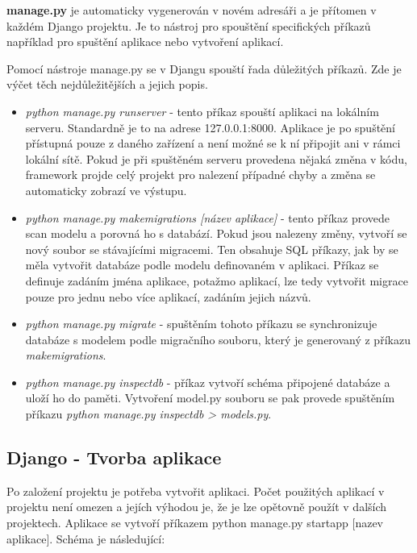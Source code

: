 \textbf{manage.py} je automaticky vygenerován v novém adresáři a je přítomen v každém Django projektu. Je to nástroj pro spouštění specifických příkazů například pro spuštění aplikace nebo vytvoření aplikací.

\newpage

Pomocí nástroje manage.py se v Djangu spouští řada důležitých příkazů. Zde je výčet těch nejdůležitějších a jejich popis.

\begin{itemize}
	\item \textit{python manage.py runserver} - tento příkaz spouští aplikaci na lokálním serveru. Standardně je to na adrese 127.0.0.1:8000. Aplikace je po spuštění přístupná pouze z daného zařízení a není možné se k ní připojit ani v rámci lokální sítě. Pokud je při spuštěném serveru provedena nějaká změna v kódu, framework projde celý projekt pro nalezení případné chyby a změna se automaticky zobrazí ve výstupu.
	
	\item \textit{python manage.py makemigrations [název aplikace]} - tento příkaz provede scan modelu a porovná ho s databází. Pokud jsou nalezeny změny, vytvoří se nový soubor se stávajícími migracemi. Ten obsahuje SQL příkazy, jak by se měla vytvořit databáze podle modelu definovaném v aplikaci. Příkaz se definuje zadáním jména aplikace, potažmo aplikací, lze tedy vytvořit migrace pouze pro jednu nebo více aplikací, zadáním jejich názvů.

	\item \textit{python manage.py migrate} - spuštěním tohoto příkazu se synchronizuje databáze s modelem podle migračního souboru, který je generovaný z příkazu \newline \textit{makemigrations}. 
	
	\item \textit{python manage.py inspectdb} - příkaz vytvoří schéma připojené databáze a uloží ho do paměti. Vytvoření model.py souboru se pak provede spuštěním příkazu
\textit{python manage.py inspectdb > models.py}.

\end{itemize}

\newpage

\subsection{Django - Tvorba aplikace}

Po založení projektu je potřeba vytvořit aplikaci. Počet použitých aplikací v projektu není omezen a jejích výhodou je, že je lze opětovně použít v dalších projektech. Aplikace se vytvoří příkazem python manage.py startapp [nazev aplikace]. Schéma je následující:

